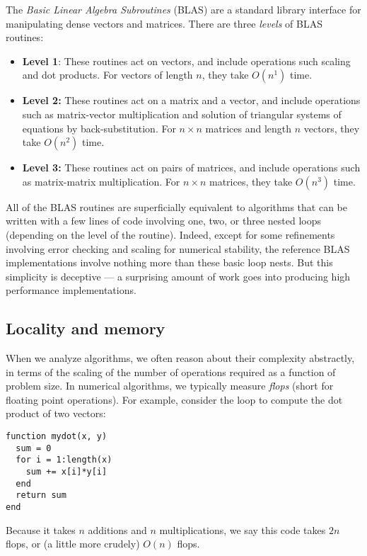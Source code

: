 \documentclass[12pt, leqno]{article}
\begin{document}
The {\em Basic Linear Algebra Subroutines} (BLAS) are a standard library
interface for manipulating dense vectors and matrices.  There are three
{\em levels} of BLAS routines:
\begin{itemize}
\item {\bf Level 1}:
  These routines act on vectors, and include operations
  such scaling and dot products.  For vectors of length $n$,
  they take $O(n^1)$ time.
\item {\bf Level 2:}
  These routines act on a matrix and a vector, and include operations
  such as matrix-vector multiplication and solution of triangular systems
  of equations by back-substitution.  For $n \times n$ matrices and length
  $n$ vectors, they take $O(n^2)$ time.
\item {\bf Level 3:}
  These routines act on pairs of matrices, and include operations such
  as matrix-matrix multiplication.  For $n \times n$ matrices, they
  take $O(n^3)$ time.
\end{itemize}
All of the BLAS routines are superficially equivalent to algorithms
that can be written with a few lines of code involving one, two, or
three nested loops (depending on the level of the routine).  Indeed,
except for some refinements involving error checking and scaling for
numerical stability, the reference BLAS implementations involve
nothing more than these basic loop nests.  But this simplicity is
deceptive --- a surprising amount of work goes into producing high
performance implementations.

\subsection{Locality and memory}

When we analyze algorithms, we often reason about their complexity
abstractly, in terms of the scaling of the number of operations required
as a function of problem size.  In numerical algorithms, we typically
measure {\em flops} (short for floating point operations).  For example,
consider the loop to compute the dot product of two vectors:
\begin{lstlisting}
function mydot(x, y)
  sum = 0
  for i = 1:length(x)
    sum += x[i]*y[i]
  end
  return sum
end
\end{lstlisting} %
Because it takes $n$ additions and $n$ multiplications, we say this code
takes $2n$ flops, or (a little more crudely) $O(n)$ flops.
\end{document}
